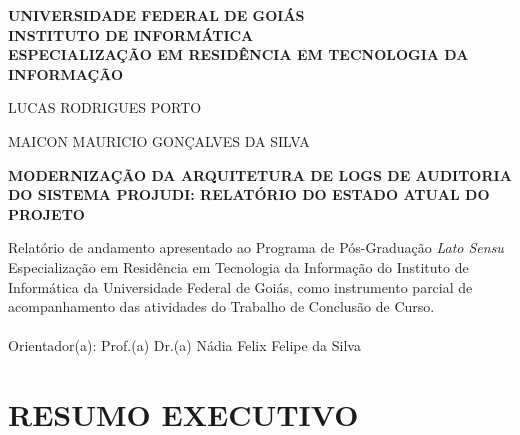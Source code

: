 \documentclass[12pt,letterpaper,oneside]{report}
\newcommand{\TituloTrabalho}{Modernização da arquitetura de logs de auditoria do sistema Projudi: relatório do estado atual do projeto}
\newcommand{\NomeUm}{LUCAS RODRIGUES PORTO}
\newcommand{\NomeDois}{MAICON MAURICIO GONÇALVES DA SILVA}
\newcommand{\Orientador}{Prof.(a) Dr.(a) Nádia Felix Felipe da Silva}
\begin{document}
\begin{titlepage}
\thispagestyle{empty}

\begin{center}
  \textbf{UNIVERSIDADE FEDERAL DE GOIÁS}\\
  \textbf{INSTITUTO DE INFORMÁTICA}\\
  \textbf{ESPECIALIZAÇÃO EM RESIDÊNCIA EM TECNOLOGIA DA INFORMAÇÃO}
\end{center}

\vspace{4.0cm}

\begin{center}
  \NomeUm
\end{center}

\begin{center}
  \NomeDois
\end{center}

\vspace{2.6cm}

\begin{center}
  {\textbf{\MakeUppercase{\TituloTrabalho}}}
\end{center}

\vspace{2.2cm}

\noindent\hfill
\begin{minipage}{0.62\textwidth}
Relatório de andamento apresentado ao Programa de Pós-Graduação \textit{Lato Sensu} Especialização em Residência em Tecnologia da Informação do Instituto de Informática da Universidade Federal de Goiás, como instrumento parcial de acompanhamento das atividades do Trabalho de Conclusão de Curso. \\ \\
Orientador(a): \Orientador
\end{minipage}

\end{titlepage}

\setcounter{page}{3}
\pagestyle{plain}


\chapter*{RESUMO EXECUTIVO}
\end{document}
